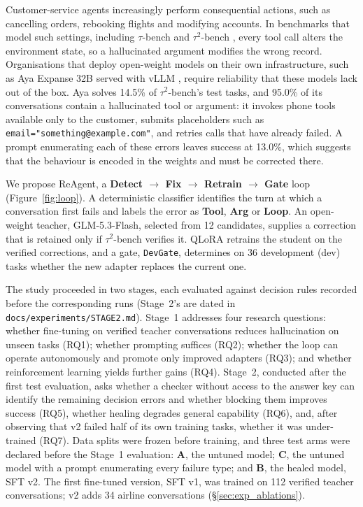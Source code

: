 \documentclass[11pt]{article}
\begin{document}
Customer-service agents increasingly perform consequential actions, such as cancelling orders, rebooking flights and modifying accounts. In benchmarks that model such settings, including $\tau$-bench and $\tau^2$-bench \citep{Yao2024TauBench,Barres2025Tau2Bench}, every tool call alters the environment state, so a hallucinated argument modifies the wrong record. Organisations that deploy open-weight models on their own infrastructure, such as Aya Expanse 32B \citep{Dang2024AyaExpanse} served with vLLM \citep{Kwon2023EfficientMemory}, require reliability that these models lack out of the box. Aya solves 14.5\% of $\tau^2$-bench's test tasks, and 95.0\% of its conversations contain a hallucinated tool or argument: it invokes phone tools available only to the customer, submits placeholders such as \texttt{email="something@example.com"}, and retries calls that have already failed. A prompt enumerating each of these errors leaves success at 13.0\%, which suggests that the behaviour is encoded in the weights and must be corrected there.

We propose ReAgent, a \textbf{Detect $\rightarrow$ Fix $\rightarrow$ Retrain $\rightarrow$ Gate} loop (Figure~\ref{fig:loop}). A deterministic classifier identifies the turn at which a conversation first fails and labels the error as \textbf{Tool}, \textbf{Arg} or \textbf{Loop}. An open-weight teacher, GLM-5.3-Flash, selected from 12 candidates, supplies a correction that is retained only if $\tau^2$-bench verifies it. QLoRA \citep{Dettmers2023QLoRA} retrains the student on the verified corrections, and a gate, \texttt{DevGate}, determines on 36 development (dev) tasks whether the new adapter replaces the current one.

The study proceeded in two stages, each evaluated against decision rules recorded before the corresponding runs (Stage~2's are dated in \texttt{docs/experiments/STAGE2.md}). Stage~1 addresses four research questions: whether fine-tuning on verified teacher conversations reduces hallucination on unseen tasks (RQ1); whether prompting suffices (RQ2); whether the loop can operate autonomously and promote only improved adapters (RQ3); and whether reinforcement learning yields further gains (RQ4). Stage~2, conducted after the first test evaluation, asks whether a checker without access to the answer key can identify the remaining decision errors and whether blocking them improves success (RQ5), whether healing degrades general capability (RQ6), and, after observing that v2 failed half of its own training tasks, whether it was under-trained (RQ7). Data splits were frozen before training, and three test arms were declared before the Stage~1 evaluation: \textbf{A}, the untuned model; \textbf{C}, the untuned model with a prompt enumerating every failure type; and \textbf{B}, the healed model, SFT v2. The first fine-tuned version, SFT v1, was trained on 112 verified teacher conversations; v2 adds 34 airline conversations (\S\ref{sec:exp_ablations}).
\end{document}
